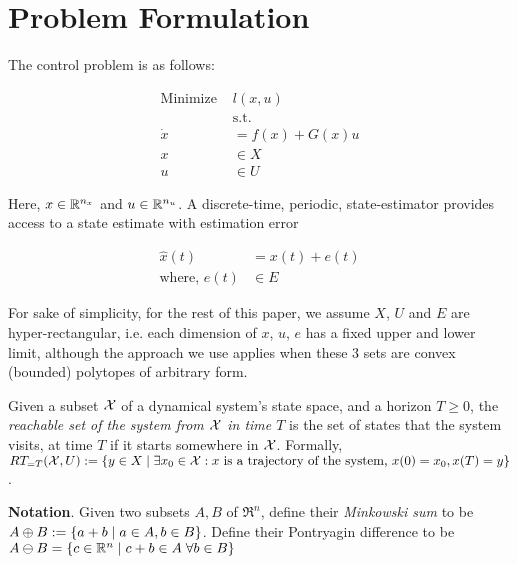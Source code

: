 \section{Problem Formulation} \label{sec:formulation}

The control problem is as follows:

\begin{subequations}
\begin{align}
\text{Minimize } &l(x,u) \\
&\text{s.t.} \nonumber \\
\dot{x}&=f(x)+G(x)u \label{eq:NL_Plant} \\
x&\in X\\
u&\in U
\end{align}
\end{subequations}

Here, $x \in \mathbb{R}^{n_x}$ and $u \in \mathbb{R}^{n_u}$. A discrete-time, periodic, state-estimator provides access to a state estimate with estimation error

\begin{subequations}
\label{eq:NL_estimate}
\begin{align}
\hat{x}(t)&=x(t)+e(t) \\ 
\text{where, } e(t) &\in E
\end{align}
\end{subequations}

For sake of simplicity, for the rest of this paper, we assume $X$, $U$ and $E$ are hyper-rectangular, i.e. each dimension of $x$, $u$, $e$ has a fixed upper and lower limit, although the approach we use applies when these 3 sets are convex (bounded) polytopes of arbitrary form.

Given a subset $\mathcal{X}$ of a dynamical system's state space, and a horizon $T \geq 0$, the \emph{reachable set of the system from $\mathcal{X}$ in time $T$} is the set of states that the system visits, at time $T$ if it starts somewhere in $\mathcal{X}$.
Formally, $RT_{=T}(\mathcal{X},U) := \{y \in X \;|\; \exists x_0 \in \mathcal{X}: x \text{ is a trajectory of the system, }x(0)=x_0, x(T)=y\}$.

\textbf{Notation}.
Given two subsets $A,B$ of $\Re^n$, define their \textit{Minkowski sum} to be $A\oplus B := \{a+b \;|\; a\in A, b\in B\}$.
Define their Pontryagin difference to be $A\ominus B = \{c \in \mathbb{R}^n \;|\; c+b \in A\; \forall b \in B\}$